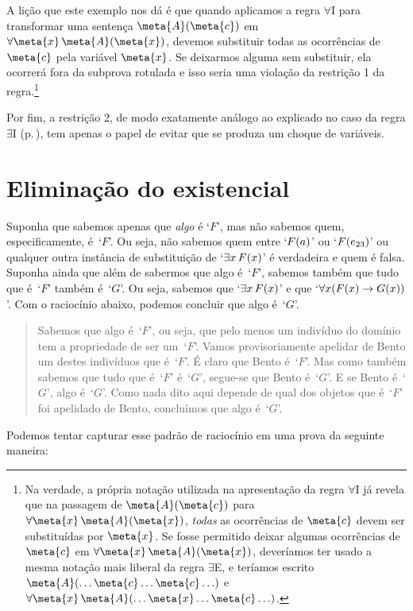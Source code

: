 A lição que este exemplo nos dá é que quando aplicamos a regra $\forall$I para transformar uma sentença $\meta{A}(\meta{c})$ em $\forall \meta{x}\,\meta{A}(\meta{x})$, devemos substituir todas as ocorrências de $\meta{c}$ pela variável $\meta{x}$.
Se deixarmos alguma sem substituir, ela ocorrerá fora da subprova rotulada e isso seria uma violação da restrição 1 da regra.\footnote{
	Na verdade, a própria notação utilizada na apresentação da regra $\forall$I já revela que na passagem de $\meta{A}(\meta{c})$ para $\forall \meta{x}\,\meta{A}(\meta{x})$, \textit{todas} as ocorrências de $\meta{c}$ devem ser substituídas por $\meta{x}$.
	Se fosse permitido deixar algumas ocorrências de $\meta{c}$ em $\forall \meta{x}\,\meta{A}(\meta{x})$, deveríamos ter usado a mesma notação mais liberal da regra $\exists$E, e teríamos escrito $\meta{A}(\ldots \meta{c}\ldots\meta{c}\ldots)$ e  $\forall \meta{x}\,\meta{A}(\ldots\meta{x}\ldots\meta{c}\ldots)$.}

Por fim, a restrição 2, de modo exatamente análogo ao explicado no caso da regra $\exists$I (p.\,\pageref{RegraEI}), tem apenas o papel de evitar que se produza um choque de variáveis.

\section{Eliminação do existencial}
Suponha que sabemos apenas que \emph{algo}  é `$F$’, mas não sabemos quem, especificamente,  é~`$F$'.  Ou seja, não sabemos quem entre `$\mathord{F}(a)$’ ou `$\mathord{F}(e_{23})$’ ou qualquer outra instância de substituição de `$\exists x\,\mathord{F}(x)$’ é verdadeira e quem é falsa.  Suponha ainda que além de sabermos que algo  é~`$F$’, sabemos também que tudo que
é~`$F$' também é~`$G$'.  Ou seja, sabemos que `$\exists x\,\mathord{F}(x)$’ e que `$\forall x(\mathord{F}(x) \rightarrow \mathord{G}(x))$’. Com o raciocínio abaixo, podemos concluir que algo é~`$G$’.
 
\begin{quote}
Sabemos que algo é~`$F$', ou seja, que pelo menos um indivíduo do domínio tem a propriedade de ser um~`$F$'. Vamos provisoriamente apelidar de Bento um destes indivíduos que é~`$F$'. É claro que Bento é~`$F$'. Mas como também sabemos que tudo que é~`$F$' é~`$G$', segue-se que Bento é~`$G$'. E se Bento é~`$G$', algo é~`$G$'. Como nada dito aqui depende de qual dos objetos que é~`$F$’ foi apelidado de Bento, concluímos que algo é~`$G$'.		
	\end{quote}
 Podemos tentar capturar esse padrão de raciocínio em uma prova da seguinte maneira:
\begin{fitchproof}
	\open
		 
	\close
\end{fitchproof}\noindent

